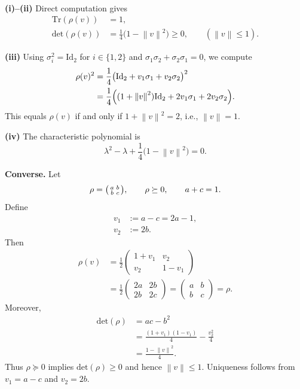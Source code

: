 \documentclass[11pt]{article}
\makeatletter
\theoremstyle{plain}
\theoremstyle{definition}
\theoremstyle{remark}
\renewenvironment{proof}[1][\proofname]{\par\pushQED{\qed}\normalfont
\topsep6\p@\@plus6\p@\relax
\trivlist\item[\hskip\labelsep\bfseries #1\@addpunct{.}]\mbox{}\\\ignorespaces}{\popQED\endtrivlist\@endpefalse}
\newcommand{\norm}[1]{\left\lVert #1 \right\rVert}
\newcommand{\Tr}{\mathrm{Tr}}
\newcommand{\Det}{\mathrm{det}}
\newcommand{\Id}{\mathrm{Id}}
\makeatother
\begin{document}
\begin{proof}
\textbf{(i)--(ii)} Direct computation gives
\begin{align*}
\Tr(\rho(v)) &= 1, \\
\Det(\rho(v)) &= \frac{1}{4}\bigl(1 - \norm{v}^2\bigr) \geq 0, \qquad (\norm{v} \leq 1).
\end{align*}

\noindent\textbf{(iii)} Using $\sigma_i^2 = \Id_2$ for $i \in \{1,2\}$ and $\sigma_1\sigma_2 + \sigma_2\sigma_1 = 0$, we compute
\begin{align*}
\rho(v)^2
&= \frac{1}{4}\bigl(\Id_2 + v_1\sigma_1 + v_2\sigma_2\bigr)^2 \\
&= \frac{1}{4}\Bigl( (1 + \norm{v}^2)\Id_2 + 2v_1\sigma_1 + 2v_2\sigma_2 \Bigr).
\end{align*}
\noindent This equals $\rho(v)$ if and only if $1 + \norm{v}^2 = 2$, i.e., $\norm{v} = 1$.

\noindent\textbf{(iv)} The characteristic polynomial is
\[
\lambda^2 - \lambda + \frac{1}{4}\bigl(1 - \norm{v}^2\bigr) = 0.
\]

\noindent\textbf{Converse.} Let
\[
\rho = \begin{psmallmatrix} a & b \\ b & c \end{psmallmatrix},
\qquad \rho \succeq 0, \qquad a + c = 1.
\]
\noindent Define
\begin{align*}
v_1 &:= a - c = 2a - 1, \\
v_2 &:= 2b.
\end{align*}
\noindent Then
\begin{align*}
\rho(v)
&= \frac{1}{2}\begin{pmatrix} 1 + v_1 & v_2 \\ v_2 & 1 - v_1 \end{pmatrix} \\
&= \frac{1}{2}\begin{pmatrix} 2a & 2b \\ 2b & 2c \end{pmatrix}
 = \begin{pmatrix} a & b \\ b & c \end{pmatrix}
 = \rho.
\end{align*}
\noindent Moreover,
\begin{align*}
\Det(\rho)
&= ac - b^2 \\
&= \frac{(1+v_1)(1-v_1)}{4} - \frac{v_2^2}{4} \\
&= \frac{1 - \norm{v}^2}{4}.
\end{align*}
\noindent Thus $\rho \succeq 0$ implies $\Det(\rho) \geq 0$ and hence $\norm{v} \leq 1$.
\noindent Uniqueness follows from $v_1 = a - c$ and $v_2 = 2b$.
\end{proof}
\end{document}
